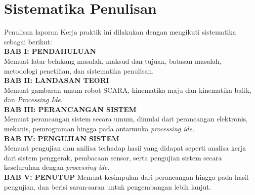 \section{Sistematika Penulisan}
Penulisan laporan Kerja praktik ini dilakukan dengan mengikuti sistematika sebagai berikut:\\
\noindent
\textbf{BAB I\hspace*{0.6cm}: PENDAHULUAN}\\
\noindent
Memuat latar belakang masalah, maksud dan tujuan, batasan masalah, metodologi penetilian, dan sistematika penulisan.\\
\noindent
\textbf{BAB II\hspace*{0.5cm}: LANDASAN TEORI}\\
\noindent
Memuat gambaran umum robot SCARA, kinematika maju dan kinematika balik, dan \emph{Processing Ide.}\\
\textbf{BAB III\hspace*{0.375cm}:  PERANCANGAN SISTEM}\\
\noindent
Memuat perancangan sistem secara umum, dimulai dari perancangan elektronis, mekanis, pemrograman hingga pada antarmuka \emph {processing ide.}\\
\textbf{BAB IV\hspace*{0.4cm}: PENGUJIAN SISTEM}\\
\noindent
Memuat pengujian dan anilisa terhadap hasil yang didapat seperti analisa kerja dari sistem penggerak, pembacaan sensor, serta pengujian sistem secara keseluruhan dengan \emph {processing ide.}
\\
\textbf{BAB V\hspace*{0.6cm}: PENUTUP}
Memuat kesimpulan dari perancangan hingga pada hasil pengujian, dan berisi saran-saran untuk pengembangan lebih lanjut.
\\



\begin{comment}

\end{comment}
